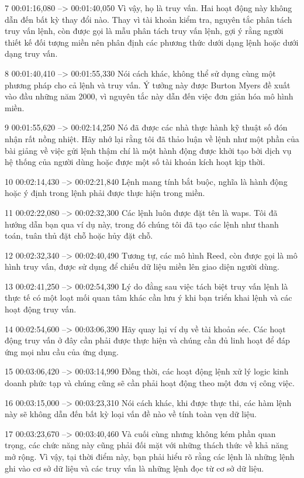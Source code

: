 7
00:01:16,080 --> 00:01:40,050
Vì vậy, họ là truy vấn.  Hai hoạt động này không dẫn đến bất kỳ thay đổi nào.  Thay vì tài khoản kiểm tra, nguyên tắc phân tách truy vấn lệnh, còn được gọi là mẫu phân tách truy vấn lệnh, gợi ý rằng người thiết kế đối tượng miền nên phân định các phương thức dưới dạng lệnh hoặc dưới dạng truy vấn.

8
00:01:40,410 --> 00:01:55,330
Nói cách khác, không thể sử dụng cùng một phương pháp cho cả lệnh và truy vấn.  Ý tưởng này được Burton Myers đề xuất vào đầu những năm 2000, vì nguyên tắc này dẫn đến việc đơn giản hóa mô hình miền.

9
00:01:55,620 --> 00:02:14,250
Nó đã được các nhà thực hành kỹ thuật số đón nhận rất nồng nhiệt.  Hãy nhớ lại rằng tôi đã thảo luận về lệnh như một phần của bài giảng về việc gửi lệnh thậm chí là một hành động được khởi tạo bởi dịch vụ hệ thống của người dùng hoặc được một số tài khoản kích hoạt kịp thời.

10
00:02:14,430 --> 00:02:21,840
Lệnh mang tính bắt buộc, nghĩa là hành động hoặc ý định trong lệnh phải được thực hiện trong miền.

11
00:02:22,080 --> 00:02:32,300
Các lệnh luôn được đặt tên là waps.  Tôi đã hướng dẫn bạn qua ví dụ này, trong đó chúng tôi đã tạo các lệnh như thanh toán, tuân thủ đặt chỗ hoặc hủy đặt chỗ.

12
00:02:32,340 --> 00:02:40,490
Tương tự, các mô hình Reed, còn được gọi là mô hình truy vấn, được sử dụng để chiếu dữ liệu miền lên giao diện người dùng.

13
00:02:41,250 --> 00:02:54,390
Lý do đằng sau việc tách biệt truy vấn lệnh là thực tế có một loạt mối quan tâm khác cần lưu ý khi bạn triển khai lệnh và các hoạt động truy vấn.

14
00:02:54,600 --> 00:03:06,390
Hãy quay lại ví dụ về tài khoản séc.  Các hoạt động truy vấn ở đây cần phải được thực hiện và chúng cần đủ linh hoạt để đáp ứng mọi nhu cầu của ứng dụng.

15
00:03:06,420 --> 00:03:14,990
Đồng thời, các hoạt động lệnh xử lý logic kinh doanh phức tạp và chúng cũng sẽ cần phải hoạt động theo một đơn vị công việc.

16
00:03:15,000 --> 00:03:23,310
Nói cách khác, khi được thực thi, các hàm lệnh này sẽ không dẫn đến bất kỳ loại vấn đề nào về tính toàn vẹn dữ liệu.

17
00:03:23,670 --> 00:03:40,460
Và cuối cùng nhưng không kém phần quan trọng, các chức năng này cũng phải đối mặt với những thách thức về khả năng mở rộng.  Vì vậy, tại thời điểm này, bạn phải hiểu rõ rằng các lệnh là những lệnh ghi vào cơ sở dữ liệu và các truy vấn là những lệnh đọc từ cơ sở dữ liệu.

